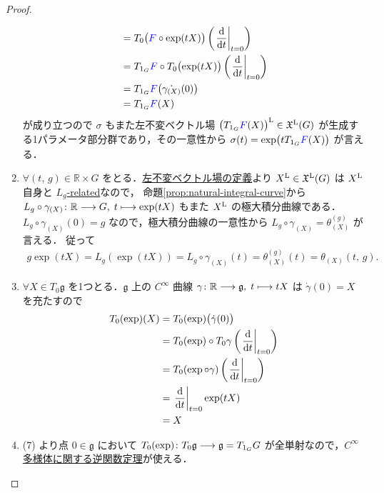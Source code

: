 \documentclass[TQFT_main]{subfiles}
\begin{document}
\begin{proof}
\begin{enumerate}
\begin{align}
            &= T_{0} \bigl( \textcolor{blue}{F} \circ \exp (tX) \bigr) \left( \eval{\dv{}{t}}_{t=0} \right) \\
            &= T_{1_G} \textcolor{blue}{F} \circ T_0 \bigl( \exp (tX)  \bigr)  \left( \eval{\dv{}{t}}_{t=0} \right) \\
            &= T_{1_G} \textcolor{blue}{F} \bigl( \dot{\gamma_{(X)}}(0) \bigr) \\
            &= T_{1_G} \textcolor{blue}{F} (X)
        \end{align}
        が成り立つので $\sigma$ もまた左不変ベクトル場 $\bigl(T_{1_G} \textcolor{blue}{F} (X)\bigr)^{\mathrm{L}} \in \mathfrak{X}^{\mathrm{L}}(G)$  が生成する1パラメータ部分群であり，その一意性から $\sigma(t) = \exp \bigl( t T_{1_G} \textcolor{blue}{F} (X) \bigr)$ が言える．
        \item $\forall (t,\, g) \in \mathbb{R} \times G$ をとる．\hyperref[def:left-invariant]{左不変ベクトル場の定義}より $X^{\mathrm{L}} \in \mathfrak{X}^{\mathrm{L}}(G)$ は $X^{\mathrm{L}}$ 自身と \hyperref[def:F-related]{$L_g$-related}なので，
        命題\ref{prop:natural-integral-curve}から $L_g \circ \gamma_{(X)} \colon \mathbb{R} \longrightarrow G,\; t \longmapsto \exp (tX)$ もまた $X^{\mathrm{L}}$ の極大積分曲線である．$L_g \circ \gamma_{(X)}(0) = g$ なので，極大積分曲線の一意性から $L_g \circ \gamma_{(X)} = \theta_{(X)}^{(g)}$ が言える．
        従って
        \begin{align}
            g \exp(tX) = L_g(\exp(tX)) = L_g \circ \gamma_{(X)}(t) = \theta_{(X)}^{(g)}(t) = \theta_{(X)} (t,\, g).
        \end{align}

        \item $\forall X \in T_0 \mathfrak{g}$ を1つとる．$\mathfrak{g}$ 上の $C^\infty$ 曲線 $\gamma \colon \mathbb{R} \longrightarrow \mathfrak{g},\; t \longmapsto t X$ は $\dot{\gamma}(0) = X$ を充たすので
        \begin{align}
            T_0 (\exp)(X)
            &= T_0(\exp) \bigl( \dot{\gamma}(0) \bigr) \\
            &= T_0 (\exp) \circ T_0 \gamma \left( \eval{\dv{}{t}}_{t=0} \right) \\
            &= T_0 (\exp \circ \gamma)  \left( \eval{\dv{}{t}}_{t=0} \right) \\
            &= \eval{\dv{}{t}}_{t=0} \exp(tX) \\
            &= X
        \end{align}
        
        \item (7) より点 $0 \in \mathfrak{g}$ において $T_0 (\exp) \colon T_0 \mathfrak{g} \longrightarrow \mathfrak{g} = T_{1_G} G$ が全単射なので，\hyperref[thm:inverse-function-b]{$C^\infty$ 多様体に関する逆関数定理}が使える．
    \end{enumerate}
\end{proof}
\end{document}
